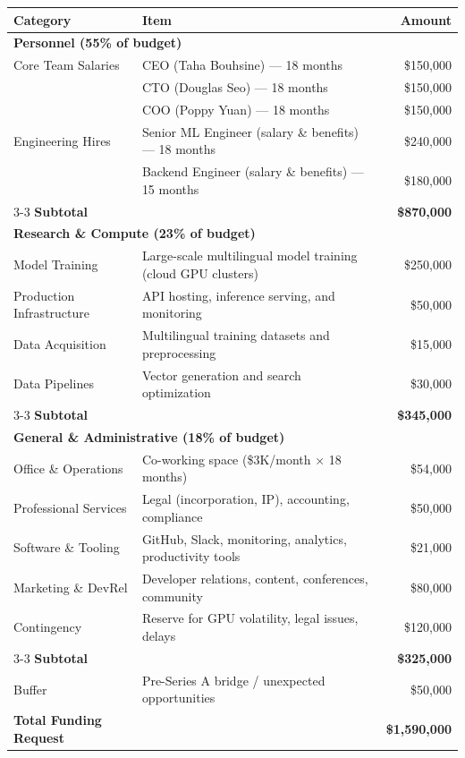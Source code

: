 \begin{table}[ht]
\centering
\begin{tabular}{p{4.5cm} p{7cm} r}
\hline
\textbf{Category} & \textbf{Item} & \textbf{Amount} \\
\hline
\multicolumn{3}{l}{\textbf{Personnel (55\% of budget)}} \\
\hline
Core Team Salaries & CEO (Taha Bouhsine) — 18 months & \$150,000 \\
 & CTO (Douglas Seo) — 18 months & \$150,000 \\
 & COO (Poppy Yuan) — 18 months & \$150,000 \\
Engineering Hires & Senior ML Engineer (salary \& benefits) — 18 months & \$240,000 \\
 & Backend Engineer (salary \& benefits) — 15 months & \$180,000 \\
\cline{3-3}
\textbf{Subtotal} & & \textbf{\$870,000} \\
\hline
\multicolumn{3}{l}{\textbf{Research \& Compute (23\% of budget)}} \\
\hline
Model Training & Large-scale multilingual model training (cloud GPU clusters) & \$250,000 \\
Production Infrastructure & API hosting, inference serving, and monitoring & \$50,000 \\
Data Acquisition & Multilingual training datasets and preprocessing & \$15,000 \\
Data Pipelines & Vector generation and search optimization & \$30,000 \\
\cline{3-3}
\textbf{Subtotal} & & \textbf{\$345,000} \\
\hline
\multicolumn{3}{l}{\textbf{General \& Administrative (18\% of budget)}} \\
\hline
Office \& Operations & Co-working space (\$3K/month × 18 months) & \$54,000 \\
Professional Services & Legal (incorporation, IP), accounting, compliance & \$50,000 \\
Software \& Tooling & GitHub, Slack, monitoring, analytics, productivity tools & \$21,000 \\
Marketing \& DevRel & Developer relations, content, conferences, community & \$80,000 \\
Contingency & Reserve for GPU volatility, legal issues, delays & \$120,000 \\
\cline{3-3}
\textbf{Subtotal} & & \textbf{\$325,000} \\
\hline
Buffer & Pre-Series A bridge / unexpected opportunities & \$50,000 \\
\hline
\hline
\textbf{Total Funding Request} & & \textbf{\$1,590,000} \\
\hline
\end{tabular}
\end{table}

